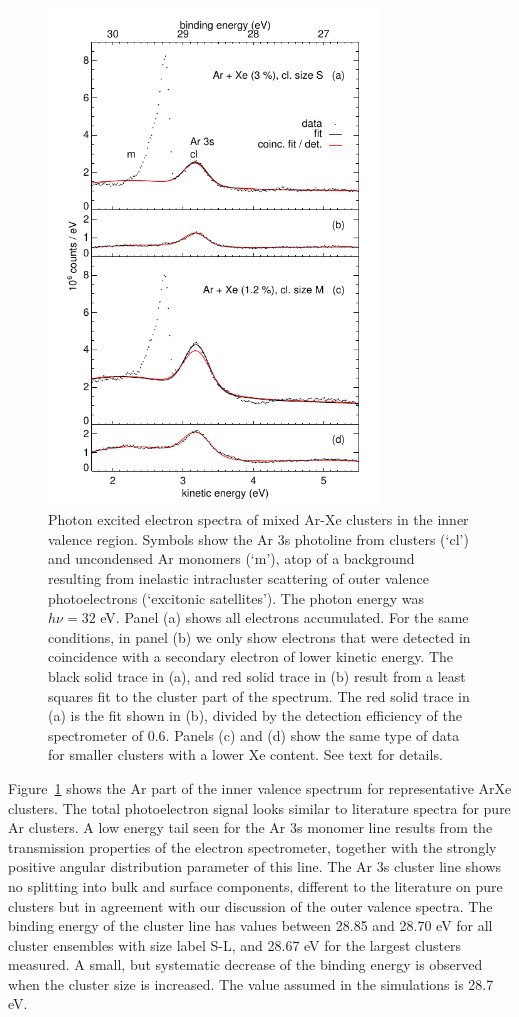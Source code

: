 \documentclass[journal=jpccck,manuscript=article]{achemso}
\begin{document}
\begin{figure}[ht]
 \centering
 \includegraphics[width=8.8cm]{figure_ival.pdf}
 \caption{
Photon excited electron spectra of mixed Ar-Xe clusters in the inner valence region.
Symbols show the Ar 3s photoline from clusters (`cl') and uncondensed Ar monomers (`m'), atop of a background resulting from inelastic intracluster scattering of outer valence photoelectrons (`excitonic satellites').\protect\cite{hergenhahn2002}
The photon energy was $h\nu = 32$ eV.
Panel (a) shows all electrons accumulated.
For the same conditions, in panel (b) we only show electrons that were detected in coincidence with a secondary electron of lower kinetic energy.
The black solid trace in (a), and red solid trace in (b) result from a least squares fit to the cluster part of the spectrum. 
The red solid trace in (a) is the fit shown in (b), divided by the detection efficiency of the spectrometer of 0.6.
Panels (c) and (d) show the same type of data for smaller clusters with a lower Xe content.
See text for details.
\label{figure:ival}
}
\end{figure}

Figure\ \ref{figure:ival} shows the Ar part of the inner valence spectrum for representative ArXe clusters. 
The total photoelectron signal looks similar to literature spectra for pure Ar clusters.\cite{feifel,zhang} 
A low energy tail seen for the Ar 3s monomer line results from the transmission properties of the electron spectrometer, together with the strongly positive angular distribution parameter of this line.\cite{zhang,kruit}
The Ar 3s cluster line shows no splitting into bulk and surface components, different to the literature on pure clusters but in agreement with our discussion of the outer valence spectra. 
The binding energy of the cluster line has values between 28.85 and 28.70 eV for all cluster ensembles with size label S-L, and 28.67 eV for the largest clusters measured. 
A small, but systematic decrease of the binding energy is observed when the cluster size is increased. 
The value assumed in the simulations is 28.7 eV.
\end{document}
